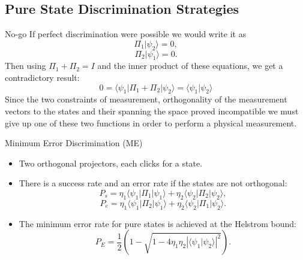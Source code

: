 \documentclass{beamer}
\newcommand{\abs}[1]{\left|{#1}\right|}
\newcommand{\br}[1]{\langle #1|}
\newcommand{\ke}[1]{|#1\rangle}
\newcommand{\bk}[2]{\langle #1|#2\rangle}
\newcommand{\var}[2]{\langle #1|#2\rangle}
\newcommand{\ov}[2]{\abs{\var{#1}{#2}}^2}
\begin{document}
\subsection{Pure State Discrimination Strategies}

\begin{frame}{No-go}
If perfect discrimination were possible we would write it as
\[\Pi_1 \ke {\psi_2} = 0,\]
\[\Pi_2 \ke {\psi_1} = 0.\]
Then using $\Pi_1 + \Pi_2 = I$ and the inner product of these equations, we get a contradictory result:
\[0= \br{\psi_1} \Pi_1 + \Pi_2 \ke {\psi_2} = \bk{\psi_1}{\psi_2} \]
 Since the two constraints of measurement,
orthogonality of the measurement vectors to the states and their spanning the space proved incompatible we must give up one of these two
functions in order to perform a physical measurement.
\end{frame}
\begin{frame}{Minimum Error Discrimination (ME)}
\begin{itemize}
\item
	Two orthogonal projectors, each clicks for a state.
\item
	There is a success rate and an error rate if the states are not orthogonal:
\[ P_s =\eta_1 \br {\psi_1} \Pi_1\ke {\psi_1} + \eta_2 \br {\psi_2} \Pi_2\ke {\psi_2},\]
\[ P_e = \eta_1 \br {\psi_1} \Pi_2\ke {\psi_1} + \eta_2 \br {\psi_2} \Pi_1\ke {\psi_2}.\]

\item
	The minimum error rate for pure states is achieved at the Helstrom bound:
\[P_E = \frac{1}{2}(1- \sqrt{1-4 \eta_1 \eta_2 \ov{\psi_1}{\psi_2}}).\]
\end{itemize}
\end{frame}
\end{document}
